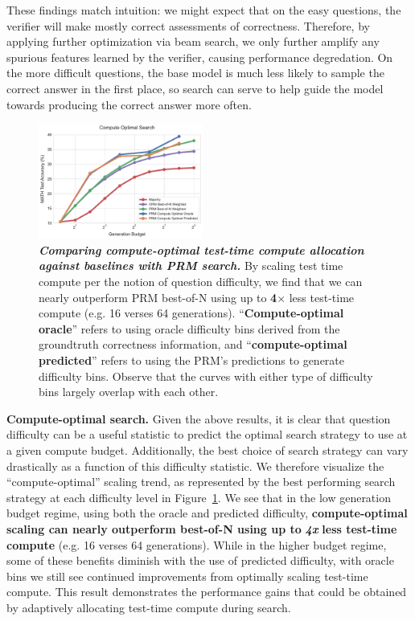 These findings match intuition: we might expect that on the easy questions, the verifier will make mostly correct assessments of correctness.  Therefore, by applying further optimization via beam search, we only further amplify any spurious features learned by the verifier, causing performance degredation.
On the more difficult questions, the base model is much less likely to sample the correct answer in the first place, so search can serve to help guide the model towards producing the correct answer more often.

\begin{figure}
    \vspace{-0.5cm}
  \centering
  \includegraphics[width=0.48\textwidth]{figures/compute_optimal_search_v4.pdf}
  \vspace{-0.3cm}
  \caption{\footnotesize{\textbf{\emph{Comparing compute-optimal test-time compute allocation against baselines with PRM search.}} By scaling test time compute per the notion of question difficulty, we find that we can nearly outperform PRM best-of-N using up to \textbf{4$\times$} less test-time compute (e.g. 16 verses 64 generations). ``\textbf{Compute-optimal oracle}'' refers to using oracle difficulty bins derived from the groundtruth correctness information, and ``\textbf{compute-optimal predicted}'' refers to using the PRM's predictions to generate difficulty bins. Observe that the curves with either type of difficulty bins largely overlap with each other.}}
  \label{fig:compute_optimal_search}
  \vspace{-0.4cm}
\end{figure}
\textbf{Compute-optimal search.} Given the above results, it is clear that question difficulty can be a useful statistic to predict the optimal search strategy to use at a given compute budget. 
Additionally, the best choice of search strategy can vary drastically as a function of this difficulty statistic. We therefore visualize the ``compute-optimal'' scaling trend, as represented by the best performing search strategy at each difficulty level in Figure~\ref{fig:compute_optimal_search}.
We see that in the low generation budget regime, using both the oracle and predicted difficulty, \textbf{compute-optimal scaling can nearly outperform best-of-N using up to} \emph{\textbf{4x}} \textbf{less test-time compute} (e.g. 16 verses 64 generations). While in the higher budget regime, some of these benefits diminish with the use of predicted difficulty, with oracle bins we still see continued improvements from optimally scaling test-time compute. This result demonstrates the performance gains that could be obtained by adaptively allocating test-time compute during search.

